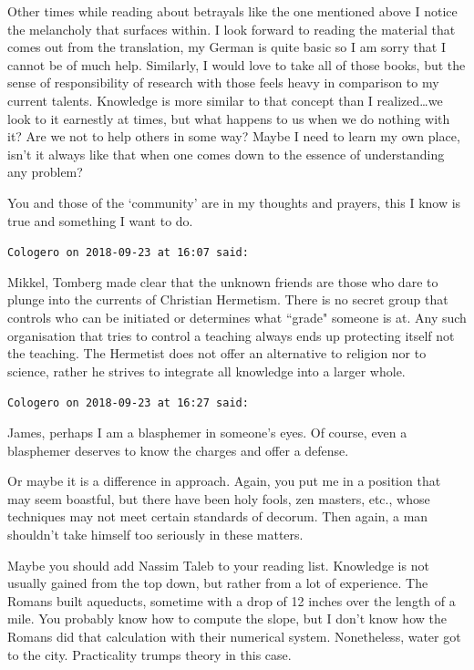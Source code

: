 \begin{footnotesize}
\begin{sffamily}
Other times while reading about betrayals like the one mentioned above I notice the melancholy that surfaces within. I look forward to reading the material that comes out from the translation, my German is quite basic so I am sorry that I cannot be of much help. Similarly, I would love to take all of those books, but the sense of responsibility of research with those feels heavy in comparison to my current talents. Knowledge is more similar to that concept than I realized…we look to it earnestly at times, but what happens to us when we do nothing with it? Are we not to help others in some way? Maybe I need to learn my own place, isn't it always like that when one comes down to the essence of understanding any problem?

You and those of the `community' are in my thoughts and prayers, this I know is true and something I want to do.


\hfill

\texttt{Cologero on 2018-09-23 at 16:07 said: }

Mikkel, Tomberg made clear that the unknown friends are those who dare to plunge into the currents of Christian Hermetism. There is no secret group that controls who can be initiated or determines what ``grade" someone is at. Any such organisation that tries to control a teaching always ends up protecting itself not the teaching. The Hermetist does not offer an alternative to religion nor to science, rather he strives to integrate all knowledge into a larger whole.


\hfill

\texttt{Cologero on 2018-09-23 at 16:27 said: }

James, perhaps I am a blasphemer in someone's eyes. Of course, even a blasphemer deserves to know the charges and offer a defense.

Or maybe it is a difference in approach. Again, you put me in a position that may seem boastful, but there have been holy fools, zen masters, etc., whose techniques may not meet certain standards of decorum. Then again, a man shouldn't take himself too seriously in these matters.

Maybe you should add Nassim Taleb to your reading list. Knowledge is not usually gained from the top down, but rather from a lot of experience. The Romans built aqueducts, sometime with a drop of 12 inches over the length of a mile. You probably know how to compute the slope, but I don't know how the Romans did that calculation with their numerical system. Nonetheless, water got to the city. Practicality trumps theory in this case.


\end{sffamily}
\end{footnotesize}
